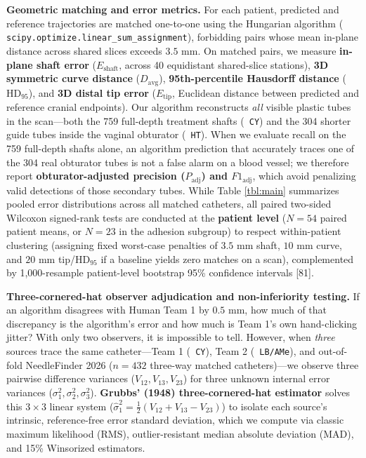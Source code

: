 \documentclass[
  11pt,
]{article}
\let\nforigtexttt\texttt
\renewcommand{\texttt}[1]{\nforigtexttt{\XeTeXinterchartokenstate=1 #1}}
\begin{document}
\textbf{Geometric matching and error metrics.} For each patient,
predicted and reference trajectories are matched one-to-one using the
Hungarian algorithm (\texttt{scipy.optimize.linear\_sum\_assignment}),
forbidding pairs whose mean in-plane distance across shared slices
exceeds \(3.5\text{ mm}\). On matched pairs, we measure \textbf{in-plane
shaft error} (\(E_{\text{shaft}}\), across 40 equidistant shared-slice
stations), \textbf{3D symmetric curve distance} (\(D_{\text{avg}}\)),
\textbf{95th-percentile Hausdorff distance} (\(\text{HD}_{95}\)), and
\textbf{3D distal tip error} (\(E_{\text{tip}}\), Euclidean distance
between predicted and reference cranial endpoints). Our algorithm
reconstructs \emph{all} visible plastic tubes in the scan---both the 759
full-depth treatment shafts (\texttt{CY}) and the 304 shorter guide
tubes inside the vaginal obturator (\texttt{HT}). When we evaluate
recall on the 759 full-depth shafts alone, an algorithm prediction that
accurately traces one of the 304 real obturator tubes is not a false
alarm on a blood vessel; we therefore report \textbf{obturator-adjusted
precision (\(P_{\text{adj}}\)) and \(F1_{\text{adj}}\)}, which avoid
penalizing valid detections of those secondary tubes. While Table
\ref{tbl:main} summarizes pooled error distributions across all matched
catheters, all paired two-sided Wilcoxon signed-rank tests are conducted
at the \textbf{patient level} (\(N = 54\) paired patient means, or
\(N = 23\) in the adhesion subgroup) to respect within-patient
clustering (assigning fixed worst-case penalties of \(3.5\text{ mm}\)
shaft, \(10\text{ mm}\) curve, and \(20\text{ mm}\)
tip/\(\text{HD}_{95}\) if a baseline yields zero matches on a scan),
complemented by 1,000-resample patient-level bootstrap 95\% confidence
intervals {[}81{]}.

\textbf{Three-cornered-hat observer adjudication and non-inferiority
testing.} If an algorithm disagrees with Human Team 1 by
\(0.5\text{ mm}\), how much of that discrepancy is the algorithm's error
and how much is Team 1's own hand-clicking jitter? With only two
observers, it is impossible to tell. However, when \emph{three} sources
trace the same catheter---Team 1 (\texttt{CY}), Team 2
(\texttt{LB/AMe}), and out-of-fold NeedleFinder 2026 (\(n = 432\)
three-way matched catheters)---we observe three pairwise difference
variances (\(V_{12}, V_{13}, V_{23}\)) for three unknown internal error
variances (\(\sigma_1^2, \sigma_2^2, \sigma_3^2\)). \textbf{Grubbs'
(1948) three-cornered-hat estimator} solves this \(3 \times 3\) linear
system (\(\hat{\sigma}_1^2 = \frac{1}{2}(V_{12} + V_{13} - V_{23})\)) to
isolate each source's intrinsic, reference-free error standard
deviation, which we compute via classic maximum likelihood (RMS),
outlier-resistant median absolute deviation (MAD), and 15\% Winsorized
estimators.
\end{document}
